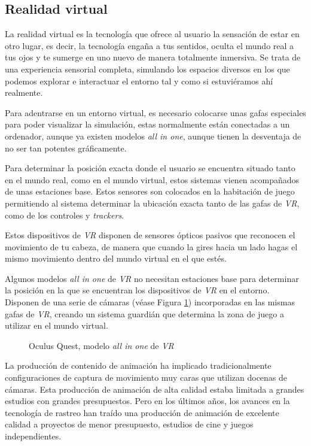 \subsection{Realidad virtual}
\label{cap3:sec:realidadVirtual}

La realidad virtual es la tecnología que ofrece al usuario la sensación de estar en otro lugar, es decir, la tecnología engaña a tus sentidos, oculta el mundo real a tus ojos y te sumerge en uno nuevo de manera totalmente inmersiva. Se trata de una experiencia sensorial completa, simulando los espacios diversos en los que podemos explorar e interactuar el entorno tal y como si estuviéramos ahí realmente.

Para adentrarse en un entorno virtual, es necesario colocarse unas gafas especiales para poder visualizar la simulación, estas normalmente están conectadas a un ordenador, aunque ya existen modelos \textit{all in one}, aunque tienen la desventaja de no ser tan potentes gráficamente. 

Para determinar la posición exacta donde el usuario se encuentra situado tanto en el mundo real, como en el mundo virtual, estos sistemas vienen acompañados de unas estaciones base. Estos sensores son colocados en la habitación de juego permitiendo al sistema determinar la ubicación exacta tanto de las gafas de \textit{VR}, como de los controles y \textit{trackers}. 

Estos dispositivos de \textit{VR} disponen de sensores ópticos pasivos que reconocen el movimiento de tu cabeza, de manera que cuando la gires hacia un lado hagas el mismo movimiento dentro del mundo virtual en el que estés. 

Algunos modelos \textit{all in one} de \textit{VR} no necesitan estaciones base para determinar la posición en la que se encuentran los dispositivos de \textit{VR} en el entorno. Disponen de una serie de cámaras (véase Figura \ref{fig:Quest}) incorporadas en las mismas gafas de \textit{VR}, creando un sistema guardián que determina la zona de juego a utilizar en el mundo virtual.

\begin{figure}[h!]
    \centering
    \caption{Oculus Quest, modelo \textit{all in one} de \textit{VR}}
    \label{fig:Quest}  
\end{figure}

La producción de contenido de animación ha implicado tradicionalmente configuraciones de captura de movimiento muy caras que utilizan docenas de cámaras. Esta producción de animación de alta calidad estaba limitada a grandes estudios con grandes presupuestos. Pero en los últimos años, los avances en la tecnología de rastreo han traído una producción de animación de excelente calidad a proyectos de menor presupuesto, estudios de cine y juegos independientes.\cite{Vive}

